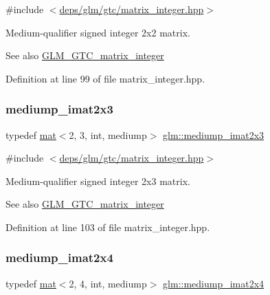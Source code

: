 {\ttfamily \#include $<$\hyperlink{matrix__integer_8hpp}{deps/glm/gtc/matrix\+\_\+integer.\+hpp}$>$}

Medium-\/qualifier signed integer 2x2 matrix. \begin{DoxySeeAlso}{See also}
\hyperlink{group__gtc__matrix__integer}{G\+L\+M\+\_\+\+G\+T\+C\+\_\+matrix\+\_\+integer} 
\end{DoxySeeAlso}


Definition at line 99 of file matrix\+\_\+integer.\+hpp.

\mbox{\label{group__gtc__matrix__integer_ga1e2d944bde5dfe9fe49824c4c3457e30}} 
\subsubsection{\texorpdfstring{mediump\+\_\+imat2x3}{mediump\_imat2x3}}
{\footnotesize\ttfamily typedef \hyperlink{structglm_1_1mat}{mat}$<$2, 3, int, mediump$>$ \hyperlink{group__gtc__matrix__integer_ga1e2d944bde5dfe9fe49824c4c3457e30}{glm\+::mediump\+\_\+imat2x3}}



{\ttfamily \#include $<$\hyperlink{matrix__integer_8hpp}{deps/glm/gtc/matrix\+\_\+integer.\+hpp}$>$}

Medium-\/qualifier signed integer 2x3 matrix. \begin{DoxySeeAlso}{See also}
\hyperlink{group__gtc__matrix__integer}{G\+L\+M\+\_\+\+G\+T\+C\+\_\+matrix\+\_\+integer} 
\end{DoxySeeAlso}


Definition at line 103 of file matrix\+\_\+integer.\+hpp.

\mbox{\label{group__gtc__matrix__integer_gabc256c695f6fe794f809f2d1ee667d6e}} 
\subsubsection{\texorpdfstring{mediump\+\_\+imat2x4}{mediump\_imat2x4}}
{\footnotesize\ttfamily typedef \hyperlink{structglm_1_1mat}{mat}$<$2, 4, int, mediump$>$ \hyperlink{group__gtc__matrix__integer_gabc256c695f6fe794f809f2d1ee667d6e}{glm\+::mediump\+\_\+imat2x4}}



